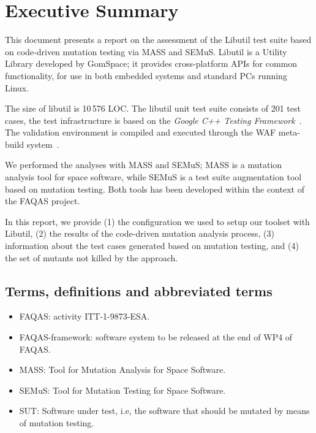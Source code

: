 
\chapter{Executive Summary}

This document presents a report on the assessment of the Libutil test suite based on code-driven mutation testing via MASS and SEMuS. 
Libutil is a Utility Library developed by GomSpace; it provides cross-platform APIs for common functionality, for use in both embedded systems and standard PCs running Linux. 


The size of libutil is 10\,576 LOC. The libutil unit test suite consists of 201 test cases, the test infrastructure is based on the \emph{Google C++ Testing Framework}~\cite{googletest}. The validation environment is compiled and executed through the WAF meta-build system~\cite{waf}.


We performed the analyses with MASS and SEMuS; MASS is a mutation analysis tool for space software, while SEMuS is a test suite augmentation tool based on mutation testing. Both tools has been developed within the context of the FAQAS project.

In this report, we provide (1) the configuration we used to setup our toolset with Libutil, (2) the results of the code-driven mutation analysis process, (3) information about the test cases generated based on mutation testing, and  (4) the set of mutants not killed by the approach.




\section{Terms, definitions and abbreviated terms}

\begin{itemize}
\item{FAQAS}: activity ITT-1-9873-ESA.
\item{FAQAS-framework}: software system to be released at the end of WP4 of FAQAS.
\item{MASS}: Tool for Mutation Analysis for Space Software.
\item{SEMuS}: Tool for Mutation Testing for Space Software.
\item{SUT}: Software under test, i.e, the software that should be mutated by means of mutation testing.

\end{itemize}

\clearpage

